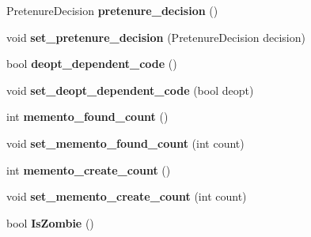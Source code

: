 \begin{DoxyCompactItemize}
\item 
\hypertarget{classv8_1_1internal_1_1_allocation_site_a858cfe6ed6ee70029b3a23c4e186c3ba}{}Pretenure\+Decision {\bfseries pretenure\+\_\+decision} ()\label{classv8_1_1internal_1_1_allocation_site_a858cfe6ed6ee70029b3a23c4e186c3ba}

\item 
\hypertarget{classv8_1_1internal_1_1_allocation_site_a3eb7bfb649894bc1ea0875152aff118e}{}void {\bfseries set\+\_\+pretenure\+\_\+decision} (Pretenure\+Decision decision)\label{classv8_1_1internal_1_1_allocation_site_a3eb7bfb649894bc1ea0875152aff118e}

\item 
\hypertarget{classv8_1_1internal_1_1_allocation_site_ad346c72b5d5c204cbb5ca3c5d42de25b}{}bool {\bfseries deopt\+\_\+dependent\+\_\+code} ()\label{classv8_1_1internal_1_1_allocation_site_ad346c72b5d5c204cbb5ca3c5d42de25b}

\item 
\hypertarget{classv8_1_1internal_1_1_allocation_site_a6b6321178dbb71e389194b39a6ee51ee}{}void {\bfseries set\+\_\+deopt\+\_\+dependent\+\_\+code} (bool deopt)\label{classv8_1_1internal_1_1_allocation_site_a6b6321178dbb71e389194b39a6ee51ee}

\item 
\hypertarget{classv8_1_1internal_1_1_allocation_site_a09e237ddea93fe5f26592f3f4d86d73b}{}int {\bfseries memento\+\_\+found\+\_\+count} ()\label{classv8_1_1internal_1_1_allocation_site_a09e237ddea93fe5f26592f3f4d86d73b}

\item 
\hypertarget{classv8_1_1internal_1_1_allocation_site_ad74c42dccc41adcc6d7f2dd22fa56176}{}void {\bfseries set\+\_\+memento\+\_\+found\+\_\+count} (int count)\label{classv8_1_1internal_1_1_allocation_site_ad74c42dccc41adcc6d7f2dd22fa56176}

\item 
\hypertarget{classv8_1_1internal_1_1_allocation_site_aa5dae1f833730f55ab548a2981c577fd}{}int {\bfseries memento\+\_\+create\+\_\+count} ()\label{classv8_1_1internal_1_1_allocation_site_aa5dae1f833730f55ab548a2981c577fd}

\item 
\hypertarget{classv8_1_1internal_1_1_allocation_site_ab95f8e888faad709405944f3f5223378}{}void {\bfseries set\+\_\+memento\+\_\+create\+\_\+count} (int count)\label{classv8_1_1internal_1_1_allocation_site_ab95f8e888faad709405944f3f5223378}

\item 
\hypertarget{classv8_1_1internal_1_1_allocation_site_ab43e6d803b8a1f9b160936060e487542}{}bool {\bfseries Is\+Zombie} ()\label{classv8_1_1internal_1_1_allocation_site_ab43e6d803b8a1f9b160936060e487542}


\end{DoxyCompactItemize}

